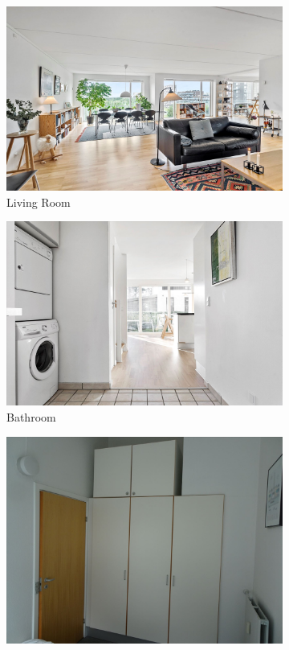 \begin{figure}[H]
  \centering %
  \begin{subfigure}{0.3\textwidth}
    \includegraphics[width=\linewidth]{pictures/random/bexample_livingroom}
    \caption{Living Room}
  \end{subfigure}\hfil %
  \begin{subfigure}{0.3\textwidth}
    \includegraphics[width=\linewidth]{pictures/random/bexample_bathroom}
    \caption{Bathroom}
  \end{subfigure}\hfil %
  \begin{subfigure}{0.3\textwidth}
    \includegraphics[width=\linewidth]{pictures/random/bexample_bedroom}

\end{subfigure}
\end{figure}

